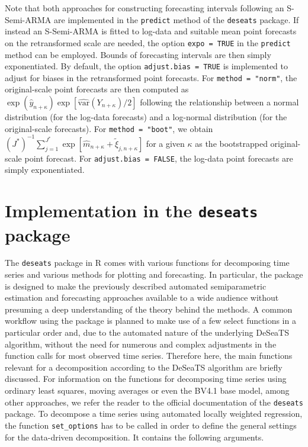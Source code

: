 Note that both approaches for constructing forecasting intervals following an S-Semi-ARMA are implemented in the \texttt{predict} method of the \texttt{deseats} package. If instead an S-Semi-ARMA is fitted to log-data and suitable mean point forecasts on the retransformed scale are needed, the option \texttt{expo\ =\ TRUE} in the \texttt{predict} method can be employed. Bounds of forecasting intervals are then simply exponentiated. By default, the option \texttt{adjust.bias\ =\ TRUE} is implemented to adjust for biases in the retransformed point forecasts. For \texttt{method\ =\ "norm"}, the original-scale point forecasts are then computed as \(\exp\left(\hat y_{n+\kappa}\right)\exp\left[\widehat{\text{var}}\left(Y_{n+\kappa}\right) / 2\right]\) following the relationship between a normal distribution (for the log-data forecasts) and a log-normal distribution (for the original-scale forecasts). For \texttt{method\ =\ "boot"}, we obtain \(\left(J^{*}\right)^{-1}\sum_{j=1}^{J^{*}}\exp\left[\hat m_{n+\kappa}+\tilde{\xi}_{j,n+\kappa}\right]\) for a given \(\kappa\) as the bootstrapped original-scale point forecast. For \texttt{adjust.bias\ =\ FALSE}, the log-data point forecasts are simply exponentiated.

\section{\texorpdfstring{Implementation in the \texttt{deseats} package}{Implementation in the deseats package}}\label{sec:deseatspkg}

The \texttt{deseats} package in R comes with various functions for decomposing time series and various methods for plotting and forecasting. In particular, the package is designed to make the previously described automated semiparametric estimation and forecasting approaches available to a wide audience without presuming a deep understanding of the theory behind the methods. A common workflow using the package is planned to make use of a few select functions in a particular order and, due to the automated nature of the underlying DeSeaTS algorithm, without the need for numerous and complex adjustments in the function calls for most observed time series. Therefore here, the main functions relevant for a decomposition according to the DeSeaTS algorithm are briefly discussed. For information on the functions for decomposing time series using ordinary least squares, moving averages or even the BV4.1 base model, among other approaches, we refer the reader to the official documentation of the \texttt{deseats} package. To decompose a time series using automated locally weighted regression, the function \texttt{set\_options} has to be called in order to define the general settings for the data-driven decomposition. It contains the following arguments.

